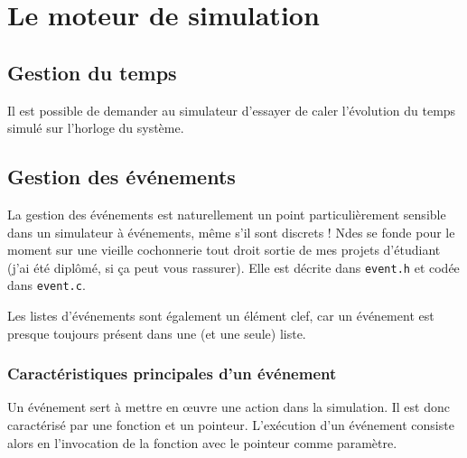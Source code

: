 %
\section{Le moteur de simulation}
\label{section:motsim}

%
\subsection{Gestion du temps}

   Il est possible de demander au simulateur d'essayer de caler
l'évolution du temps simulé sur l'horloge du système.


%
\subsection{Gestion des événements}

   La gestion des événements est naturellement un point
particulièrement sensible dans un simulateur à événements, même s'il
sont discrets ! {\sc Ndes} se fonde pour le moment sur une vieille
cochonnerie tout droit sortie de mes projets d'étudiant (j'ai été
diplômé, si ça peut vous rassurer). Elle est décrite dans {\tt event.h}
et codée dans {\tt event.c}.

   Les listes d'événements sont également un élément clef, car un
événement est presque toujours présent dans une (et une seule) liste.

%
\subsubsection{Caractéristiques principales d'un événement}

   Un événement sert à mettre en \oe{}uvre une action dans la
simulation. Il est donc caractérisé par une fonction et un
pointeur. L'exécution d'un événement consiste alors en l'invocation de
la fonction avec le pointeur comme paramètre.

